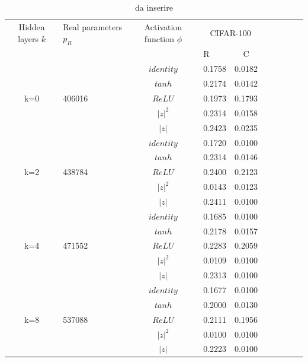 \documentclass[a4paper,10pt]{article}
\begin{document}
 
 \begin{table}
  \centering
  \begin{tabular}{cp{} cp{}   cp{} cp{} cp{}}
   \cline{1-5}
   Hidden layers $k$ & Real parameters $p_R$ & Activation function $\phi$ & \multicolumn{2}{c}{CIFAR-100}\\
   \cline{4-5}
   & & & R & C \\
   \cline{1-5}
   & & $identity$ & 0.1758 & 0.0182 \\
   \cline{3-5}
   & & $tanh$ & 0.2174 & 0.0142 \\
   \cline{3-5}
   k=0 & 406016 & $ReLU$ & 0.1973 & 0.1793 \\
   \cline{3-5}
   & & $|z|^2$ & 0.2314 & 0.0158 \\
   \cline{3-5}
   & & $|z|$ & 0.2423 & 0.0235 \\
   \cline{1-5}
  
   & & $identity$ & 0.1720 & 0.0100 \\
   \cline{3-5}
   & & $tanh$ & 0.2314 & 0.0146 \\
   \cline{3-5}
   k=2 & 438784 & $ReLU$ & 0.2400 & 0.2123 \\
   \cline{3-5}
   & & $|z|^2$ & 0.0143 & 0.0123 \\
   \cline{3-5}
   & & $|z|$ & 0.2411 & 0.0100 \\
   \cline{1-5}
  
   & & $identity$ & 0.1685 & 0.0100 \\
   \cline{3-5}
   & & $tanh$ & 0.2178 & 0.0157 \\
   \cline{3-5}
   k=4 & 471552 & $ReLU$ & 0.2283 & 0.2059 \\
   \cline{3-5}
   & & $|z|^2$ & 0.0109 & 0.0100 \\
   \cline{3-5}
   & & $|z|$ & 0.2313 & 0.0100 \\
   \cline{1-5}
   
   & & $identity$ & 0.1677 & 0.0100 \\
   \cline{3-5}
   & & $tanh$ & 0.2000 & 0.0130 \\
   \cline{3-5}
   k=8 & 537088 & $ReLU$ & 0.2111 & 0.1956 \\
   \cline{3-5}
   & & $|z|^2$ & 0.0100 & 0.0100 \\
   \cline{3-5}
   & & $|z|$ & 0.2223 & 0.0100 \\
   \cline{1-5}
  \end{tabular}
  \caption{da inserire}
  \label{CIFAR-1001Tab}
 \end{table}
 
\end{document}
